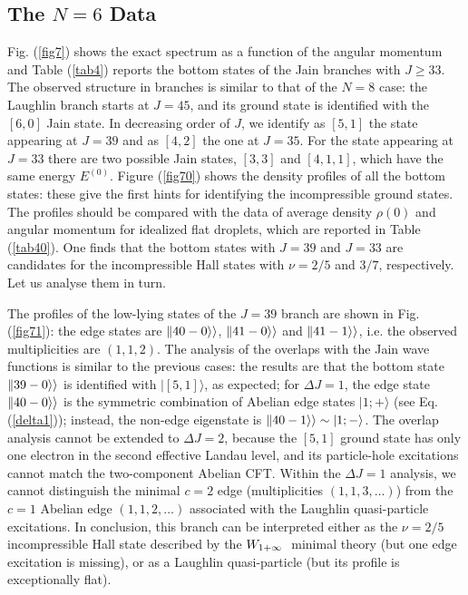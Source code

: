 \subsection{The $N=6$ Data}

Fig. (\ref{fig7}) shows the exact spectrum as a function
of the angular momentum and Table (\ref{tab4}) reports 
the bottom states of the Jain branches with $J\ge 33$.
The observed structure in branches is
similar to that of the $N=8$ case: the Laughlin branch starts 
at $J=45$, and its ground state is identified with the $[6,0]$
Jain state. In decreasing order of $J$, we identify as $[5,1]$
the state appearing at $J=39$ and as $[4,2]$ the one at $J=35$.
For the state appearing at $J=33$ there are two possible Jain
states, $[3,3]$ and $[4,1,1]$, which have the same energy $E^{(0)}$.
Figure (\ref{fig70}) shows the density profiles of all
the bottom states: these give the first hints for identifying
the incompressible ground states. 
The profiles should be compared with the data of average
density $\rho(0)$ and angular momentum for idealized flat
droplets, which are reported in Table (\ref{tab40}).
One finds that the bottom states with $J=39$ and $J=33$
are candidates for the incompressible Hall states with
$\nu=2/5$ and $3/7$, respectively. Let us analyse them in turn.

The profiles of the low-lying states of the $J=39$ branch are
shown in Fig.(\ref{fig71}): the edge states are
$\Vert 40-0 \rangle\rangle$, $\Vert 41-0\rangle\rangle$ and $\Vert 41-1 \rangle\rangle$,
i.e. the observed multiplicities are $(1,1,2)$.
The analysis of the overlaps with the Jain wave functions is similar
to the previous cases: the results are that 
the bottom state $\Vert 39-0\rangle\rangle$ is identified with $\vert [5,1]\rangle$,
as expected; for $\Delta J=1$, the edge state $ \Vert 40-0\rangle\rangle$
is the symmetric combination of Abelian edge states
$\vert 1;+\rangle$ (see Eq.(\ref{delta1})); instead, the non-edge 
eigenstate is $\Vert 40-1\rangle\rangle\sim\vert 1; -\rangle$.
The overlap analysis cannot be extended to $\Delta J=2$, because
the $[5,1]$ ground state has only one electron in the second effective
Landau level, and its particle-hole excitations cannot match the
two-component Abelian CFT.
Within the $\Delta J=1$ analysis, we cannot distinguish
the minimal $c=2$ edge (multiplicities $(1,1,3,\dots)$)
from the $c=1$ Abelian edge $(1,1,2,\dots)$ associated with the
Laughlin quasi-particle excitations.
In conclusion, this branch can be interpreted either as the $\nu=2/5$
incompressible Hall state described by the $W_{1+\infty}\ $ minimal theory
(but one edge excitation is missing),
or as a Laughlin quasi-particle (but its profile is 
exceptionally flat).

